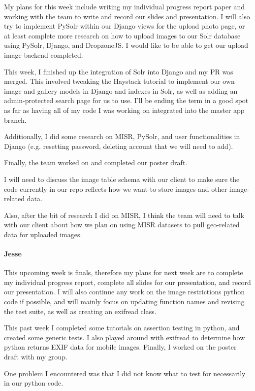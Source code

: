 \documentclass[onecolumn, draftclsnofoot,10pt, compsoc]{IEEEtran}
\begin{document}
\begin{flushleft}
My plans for this week include writing my individual progress report paper and working with the team to write and record our slides and presentation. I will also try to implement PySolr within our Django views for the upload photo page, or at least complete more research on how to upload images to our Solr database using PySolr, Django, and DropzoneJS. I would like to be able to get our upload image backend completed.
 
 
This week, I finished up the integration of Solr into Django and my PR was merged. This involved tweaking the Haystack tutorial to implement our own image and gallery models in Django and indexes in Solr, as well as adding an admin-protected search page for us to use. I'll be ending the term in a good spot as far as having all of my code I was working on integrated into the master app branch.
 
Additionally, I did some research on MISR, PySolr, and user functionalities in Django (e.g. resetting password, deleting account that we will need to add).
 
Finally, the team worked on and completed our poster draft.
 
 
I will need to discuss the image table schema with our client to make sure the code currently in our repo reflects how we want to store images and other image-related data.
 
Also, after the bit of research I did on MISR, I think the team will need to talk with our client about how we plan on using MISR datasets to pull geo-related data for uploaded images.
 
\paragraph{Jesse}
 
This upcoming week is finals, therefore my plans for next week are to complete my individual progress report, complete all slides for our presentation, and record our presentation. I will also continue any work on the image restrictions python code if possible, and will mainly focus on updating function names and revising the test suite, as well as creating an exifread class.
 
 
This past week I completed some tutorials on assertion testing in python, and created some generic tests. I also played around with exifread to determine how python returns EXIF data for mobile images. Finally, I worked on the poster draft with my group.
 
 
One problem I encountered was that I did not know what to test for necessarily in our python code.
 

\end{flushleft}
\end{document}
